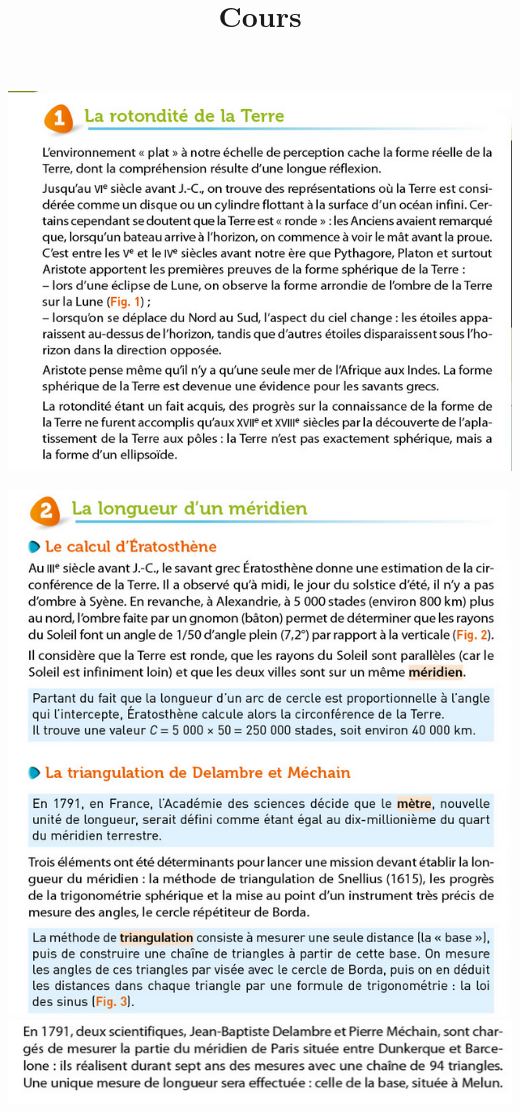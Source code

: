 \documentclass[10pt]{article}
\newcommand{\titreActivite}{Cours} %
\newcommand{\myscale}{0.55}
\begin{document}
\date{}
\title{\titreActivite}
\maketitle %


\begin{center}

	\begin{minipage}[c]{0.6\textwidth}
		\centering
		\includegraphics[scale=\myscale]{assets/1.png}

		\includegraphics[scale=\myscale]{assets/2a.png}
		\includegraphics[scale=\myscale]{assets/2b.png}


\end{minipage}
\end{center}
\end{document}
